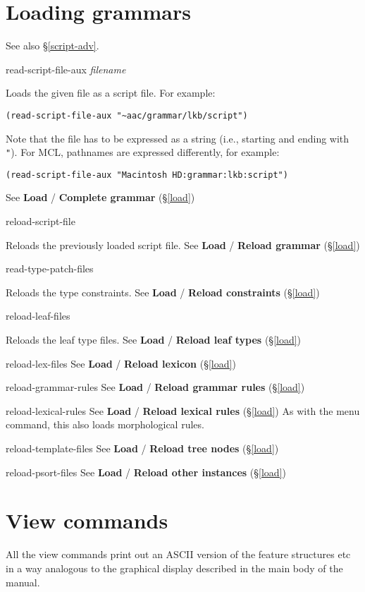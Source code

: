 \documentclass[12pt]{report}
\newcommand{\lispcommand}[1]{\noindent\rm #1}%
\begin{document}
\section{Loading grammars}

See also \S\ref{script-adv}.

\lispcommand{read-script-file-aux {\it filename}}

Loads the given file as a script file.
For example: 
\begin{verbatim}
(read-script-file-aux "~aac/grammar/lkb/script")
\end{verbatim}
Note that the file has to be expressed as a string
(i.e., starting and ending with {\tt "}).
For MCL, pathnames are expressed differently, for example:
\begin{verbatim}
(read-script-file-aux "Macintosh HD:grammar:lkb:script")
\end{verbatim}
See {\bf Load} / {\bf Complete grammar} (\S\ref{load})

\lispcommand{reload-script-file}

Reloads the previously loaded script file.
See {\bf Load} / {\bf Reload grammar} (\S\ref{load})

\lispcommand{read-type-patch-files}

Reloads the type constraints.
See {\bf Load} / {\bf Reload constraints} (\S\ref{load})

\lispcommand{reload-leaf-files}

Reloads the leaf type files.
See {\bf Load} / {\bf Reload leaf types} (\S\ref{load})

\lispcommand{reload-lex-files}
See {\bf Load} / {\bf Reload lexicon} (\S\ref{load})

\lispcommand{reload-grammar-rules}
See {\bf Load} / {\bf Reload grammar rules} (\S\ref{load})

\lispcommand{reload-lexical-rules}
See {\bf Load} / {\bf Reload lexical rules} (\S\ref{load})
As with the menu command, this also loads morphological rules.

\lispcommand{reload-template-files}
See {\bf Load} / {\bf Reload tree nodes} (\S\ref{load})

\lispcommand{reload-psort-files}
See {\bf Load} / {\bf Reload other instances} (\S\ref{load})


\section{View commands}

All the view commands print out an ASCII version of the 
feature structures etc in a way analogous to the
graphical display described in the main body of the manual.
\end{document}
